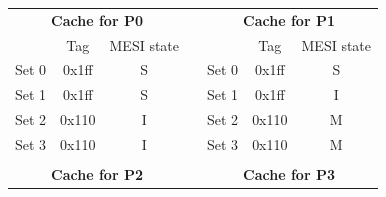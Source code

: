 \documentclass[12pt]{article}
\begin{document}
\begin{table}[H]
 	\centering
		\begin{tabular}{ccclccc}
			\cline{1-3} \cline{5-7}
			\multicolumn{3}{|c|}{\textbf{Cache for P0}}                                                                       & \multicolumn{1}{c|}{} & \multicolumn{3}{c|}{\textbf{Cache for P1}}                                                                       \\ \cline{1-3} \cline{5-7} 
			\multicolumn{1}{|c|}{}      & \multicolumn{1}{c|}{Tag}                          & \multicolumn{1}{c|}{MESI state} & \multicolumn{1}{l|}{} & \multicolumn{1}{c|}{}      & \multicolumn{1}{c|}{Tag}                          & \multicolumn{1}{c|}{MESI state} \\ \cline{1-3} \cline{5-7} 
			\multicolumn{1}{|c|}{Set 0} & \multicolumn{1}{c|}{{\color[HTML]{6200C9} 0x1ff}} & \multicolumn{1}{c|}{S}          & \multicolumn{1}{l|}{} & \multicolumn{1}{c|}{Set 0} & \multicolumn{1}{c|}{{\color[HTML]{6200C9} 0x1ff}} & \multicolumn{1}{c|}{S}          \\ \cline{1-3} \cline{5-7} 
			\multicolumn{1}{|c|}{Set 1} & \multicolumn{1}{c|}{{\color[HTML]{329A9D} 0x1ff}} & \multicolumn{1}{c|}{S}          & \multicolumn{1}{l|}{} & \multicolumn{1}{c|}{Set 1} & \multicolumn{1}{c|}{{\color[HTML]{329A9D} 0x1ff}} & \multicolumn{1}{c|}{I}          \\ \cline{1-3} \cline{5-7} 
			\multicolumn{1}{|c|}{Set 2} & \multicolumn{1}{c|}{{\color[HTML]{FF7A00} 0x110}} & \multicolumn{1}{c|}{I}          & \multicolumn{1}{l|}{} & \multicolumn{1}{c|}{Set 2} & \multicolumn{1}{c|}{{\color[HTML]{FF7A00} 0x110}} & \multicolumn{1}{c|}{M}          \\ \cline{1-3} \cline{5-7} 
			\multicolumn{1}{|c|}{Set 3} & \multicolumn{1}{c|}{{\color[HTML]{D729BE} 0x110}} & \multicolumn{1}{c|}{I}          & \multicolumn{1}{l|}{} & \multicolumn{1}{c|}{Set 3} & \multicolumn{1}{c|}{{\color[HTML]{D729BE} 0x110}} & \multicolumn{1}{c|}{M}          \\ \cline{1-3} \cline{5-7} 
			\multicolumn{1}{l}{}        & \multicolumn{1}{l}{}                              & \multicolumn{1}{l}{}            &                       & \multicolumn{1}{l}{}       & \multicolumn{1}{l}{}                              & \multicolumn{1}{l}{}            \\ \cline{1-3} \cline{5-7} 
			\multicolumn{3}{|c|}{\textbf{Cache for P2}}                                                                       & \multicolumn{1}{c|}{} & \multicolumn{3}{c|}{\textbf{Cache for P3}}                                                                       \\ \cline{1-3} \cline{5-7} 

\end{tabular}
\end{table}
\end{document}
